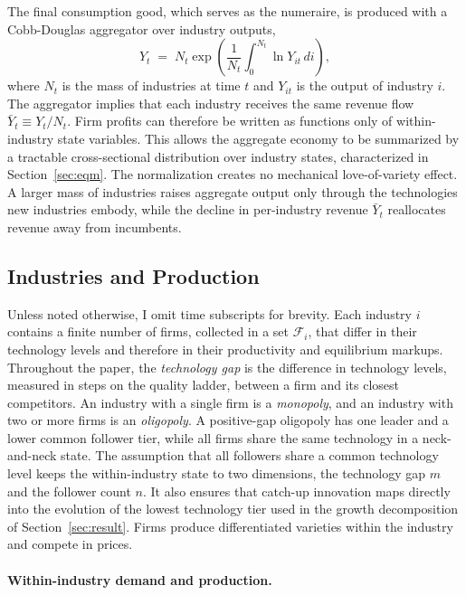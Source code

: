\documentclass[12pt]{article}
\begin{document}
The final consumption good, which serves as the numeraire, is produced with a Cobb-Douglas aggregator over industry outputs,
\begin{equation}\label{eq:aggregator}
Y_t \;=\; N_t\exp\left(\frac{1}{N_t}\int_0^{N_t}\ln Y_{it}\, di\right),
\end{equation}
where \(N_t\) is the mass of industries at time \(t\) and \(Y_{it}\) is the output of industry \(i\). The aggregator implies that each industry receives the same revenue flow \(\bar{Y}_t \equiv Y_t / N_t\). Firm profits can therefore be written as functions only of within-industry state variables. This allows the aggregate economy to be summarized by a tractable cross-sectional distribution over industry states, characterized in Section~\ref{sec:eqm}. The normalization creates no mechanical love-of-variety effect. A larger mass of industries raises aggregate output only through the technologies new industries embody, while the decline in per-industry revenue \(\bar Y_t\) reallocates revenue away from incumbents.

\subsection{Industries and Production}\label{subsec:firm_ind}

Unless noted otherwise, I omit time subscripts for brevity. Each industry \(i\) contains a finite number of firms, collected in a set \(\mathcal{F}_i\), that differ in their technology levels and therefore in their productivity and equilibrium markups. Throughout the paper, the \emph{technology gap} is the difference in technology levels, measured in steps on the quality ladder, between a firm and its closest competitors. An industry with a single firm is a \emph{monopoly}, and an industry with two or more firms is an \emph{oligopoly}. A positive-gap oligopoly has one leader and a lower common follower tier, while all firms share the same technology in a neck-and-neck state. The assumption that all followers share a common technology level keeps the within-industry state to two dimensions, the technology gap \(m\) and the follower count \(n\). It also ensures that catch-up innovation maps directly into the evolution of the lowest technology tier used in the growth decomposition of Section~\ref{sec:result}. Firms produce differentiated varieties within the industry and compete in prices.

\paragraph{Within-industry demand and production.}
\end{document}
